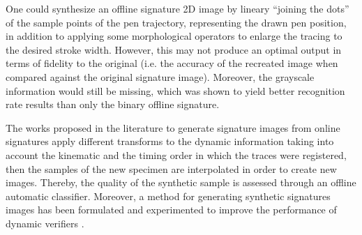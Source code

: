 One could synthesize an offline signature 2D image by lineary ``joining the dots''  of
the sample points of the pen trajectory, representing the drawn pen position, in addition to applying some morphological operators to enlarge the tracing to the desired stroke width. However, this may not produce an optimal output in terms of fidelity to the original (i.e. the accuracy of the recreated image when compared against the original signature image). Moreover, the grayscale information would still be missing, which was shown \cite{vargas2010off} to yield better recognition rate results than only the binary offline signature.

The works \cite{ferrer2013realistic, guest2013assessment, rabasse2008new, diaz2014generation} proposed in the literature to generate signature images from online signatures apply different transforms to the dynamic information taking into account the kinematic and the timing order in which the traces were registered, then the samples of the new specimen are interpolated in order to create new images. Thereby, the quality of the synthetic sample is assessed through an offline automatic classifier. Moreover, a method for generating synthetic signatures images has been formulated and experimented to improve the performance of dynamic verifiers \cite{galbally2015line}.


